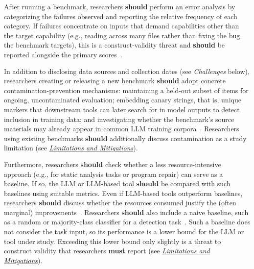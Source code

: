 \documentclass[smallextended]{svjour3}
\newcommand{\must}{\textbf{must}\xspace}
\newcommand{\should}{\textbf{should}\xspace}
\newcommand{\limitationsmitigations}{\hyperref[sec:report-limitations-and-mitigations]{\emph{Limitations and Mitigations}}\xspace}
\newcommand{\limitationsmitigations}{\href{/guidelines/limitations/}{\emph{Limitations and Mitigations}}\xspace}
\begin{document}
After running a benchmark, researchers \should perform an error analysis by categorizing the failures observed and reporting the relative frequency of each category. If failures concentrate on inputs that demand capabilities other than the target capability (e.g., reading across many files rather than fixing the bug the benchmark targets), this is a construct-validity threat and \should be reported alongside the primary scores~\cite{bean2025measuring}.

In addition to disclosing data sources and collection dates (see \emph{Challenges} below), researchers creating or releasing a new benchmark \should adopt concrete contamination-prevention mechanisms: maintaining a held-out subset of items for ongoing, uncontaminated evaluation; embedding canary strings, that is, unique markers that downstream tools can later search for in model outputs to detect inclusion in training data; and investigating whether the benchmark's source materials may already appear in common LLM training corpora~\cite{bean2025measuring, cao2025should}. Researchers using existing benchmarks \should additionally discuss contamination as a study limitation (see \limitationsmitigations).

Furthermore, researchers \should check whether a less resource-intensive approach (e.g., for static analysis tasks or program repair) can serve as a baseline. If so, the LLM or LLM-based tool \should be compared with such baselines using suitable metrics. Even if LLM-based tools outperform baselines, researchers \should discuss whether the resources consumed justify the (often marginal) improvements~\cite{DBLP:journals/cacm/Menzies25}.
Researchers \should also include a naive baseline, such as a random or majority-class classifier for a detection task~\cite{Izadi2026benchmarking}. Such a baseline does not consider the task input, so its performance is a lower bound for the LLM or tool under study. Exceeding this lower bound only slightly is a threat to construct validity that researchers \must report (see \limitationsmitigations).
\end{document}
